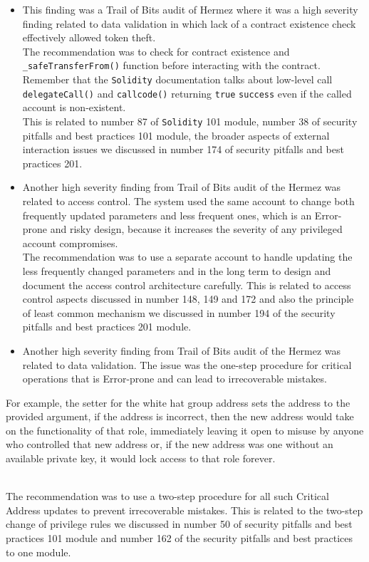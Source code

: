 \begin{itemize}
\item
  This finding was a Trail of Bits audit of Hermez where it was a high
  severity finding related to data validation in which lack of a
  contract existence check effectively allowed token theft.\\

  The recommendation was to check for contract existence and
  \texttt{\_safeTransferFrom()} function before interacting with the
  contract. Remember that the \texttt{Solidity} documentation talks
  about low-level call \texttt{delegateCall()} and \texttt{callcode()}
  returning \texttt{true} \texttt{success} even if the called account is
  non-existent.\\

  This is related to number 87 of \texttt{Solidity} 101 module, number
  38 of security pitfalls and best practices 101 module, the broader
  aspects of external interaction issues we discussed in number 174 of
  security pitfalls and best practices 201.
\item
  Another high severity finding from Trail of Bits audit of the Hermez
  was related to access control. The system used the same account to
  change both frequently updated parameters and less frequent ones,
  which is an Error-prone and risky design, because it increases the
  severity of any privileged account compromises.\\

  The recommendation was to use a separate account to handle updating
  the less frequently changed parameters and in the long term to design
  and document the access control architecture carefully. This is
  related to access control aspects discussed in number 148, 149 and 172
  and also the principle of least common mechanism we discussed in
  number 194 of the security pitfalls and best practices 201 module.
\item
  Another high severity finding from Trail of Bits audit of the Hermez
  was related to data validation. The issue was the one-step procedure
  for critical operations that is Error-prone and can lead to
  irrecoverable mistakes.
\end{itemize}

For example, the setter for the white hat group address sets the address
to the provided argument, if the address is incorrect, then the new
address would take on the functionality of that role, immediately
leaving it open to misuse by anyone who controlled that new address or,
if the new address was one without an available private key, it would
lock access to that role forever.\\
\strut \\
The recommendation was to use a two-step procedure for all such Critical
Address updates to prevent irrecoverable mistakes. This is related to
the two-step change of privilege rules we discussed in number 50 of
security pitfalls and best practices 101 module and number 162 of the
security pitfalls and best practices to one module.

